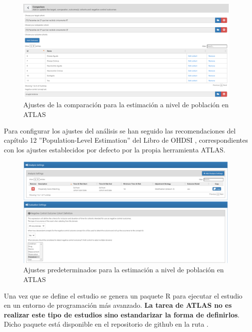 \begin{figure}[H]
    \centering
    \includegraphics[width=1\textwidth]{figures/comparisonPLE.png}
    \caption{Ajustes de la comparación para la estimación a nivel de población en ATLAS}
    \label{figure:comparisonPLE}
\end{figure}

Para configurar los ajustes del análisis se han seguido las recomendaciones del capítulo 12 ''Population-Level Estimation'' del Libro de OHDSI \cite{OHDSIbook}, correspondientes con los ajustes establecidos por defecto por la propia herramienta ATLAS. 

\begin{figure}[H]
    \centering
    \includegraphics[width=1\textwidth]{figures/ajustesPLE.png}
    \caption{Ajustes predeterminados para la estimación a nivel de población en ATLAS}
    \label{figure:ajustesPLE}
\end{figure}


Una vez que se define el estudio se genera un paquete R para ejecutar el estudio en un entorno de programación más avanzado.\textbf{ La tarea de ATLAS no es realizar este tipo de estudios sino estandarizar la forma de definirlos}. Dicho paquete está disponible en el repositorio de github en la ruta .


